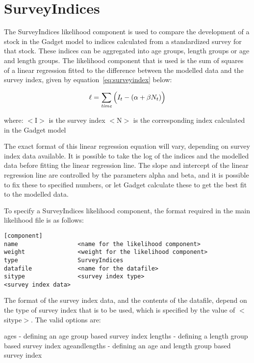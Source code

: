 \documentclass [a4paper, 10pt]{book}
\begin{document}
\section{SurveyIndices}\label{sec:surveyindices}
The SurveyIndices likelihood component is used to compare the development of a stock in the Gadget model to indices calculated from a standardized survey for that stock.  These indices can be aggregated into age groups, length groups or age and length groups.  The likelihood component that is used is the sum of squares of a linear regression fitted to the difference between the modelled data and the survey index, given by  equation~\ref{eq:surveyindex} below:

\begin{equation}\label{eq:surveyindex}
\ell = \sum_{\it time}\Big(I_{t} - (\alpha + \beta N_{t})\Big)
\end{equation}

where:\newline
$<$I$>$ is the survey index\newline
$<$N$>$ is the corresponding index calculated in the Gadget model

\bigskip
The exact format of this linear regression equation will vary, depending on survey index data available.  It is possible to take the log of the indices and the modelled data before fitting the linear regression line.  The slope and intercept of the linear regression line are controlled by the parameters alpha and beta, and it is possible to fix these to specified numbers, or let Gadget calculate these to get the best fit to the modelled data.

\bigskip
To specify a SurveyIndices likelihood component, the format required in the main likelihood file is as follows:

\begin{verbatim}
[component]
name                 <name for the likelihood component>
weight               <weight for the likelihood component>
type                 SurveyIndices
datafile             <name for the datafile>
sitype               <survey index type>
<survey index data>
\end{verbatim}

The format of the survey index data, and the contents of the datafile, depend on the type of survey index that is to be used, which is specified by the value of $<$sitype$>$.  The valid options are:\newline

ages - defining an age group based survey index\newline
lengths - defining a length group based survey index\newline
ageandlengths - defining an age and length group based survey index
\end{document}
